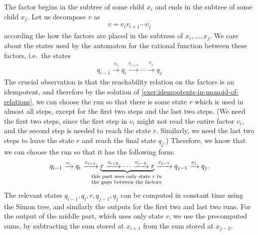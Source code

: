 {The factor begins in the subtree of some child $x_i$ and ends in the subtree of some child $x_j$. Let us decompose $v$ as 
\begin{align*}
v = v_i v_{i+1} \cdots v_{j}
\end{align*}
according the how the factors are placed in the subtrees of $x_i,\ldots,x_j$. We care about the states used by the automaton for the rational function between these factors, i.e.~the states 
\begin{align*}
q_{i-1} \xrightarrow {v_i} q_i \xrightarrow{v_{i+1}} \cdots \xrightarrow{v_j} q_j
\end{align*}
The crucial observation is that the reachability relation on the factors is an idempotent, and therefore by the solution of \cref{exer:idempotents-in-monoid-of-relations}, we can choose the run so that there is some state $r$ which is used in almost all steps, except for the first two steps and the last two steps. (We need the first two steps, since the first step in $v_i$ might not read the entire factor $v_i$, and the second step is needed to reach the state $r$. Similarly, we need the last two steps to leave the state $r$ and reach the final state $q_j$.) Therefore, we know that we can choose the run so that it has the following form:
\begin{align*}
q_{i-1} \xrightarrow {v_i} q_i \xrightarrow{v_{i+1}} \myunderbrace{r \xrightarrow{v_{i+2}} \cdots  \xrightarrow{v_{j-2}} r}{this part uses only state $r$ in \\ the gaps between the factors} \xrightarrow{v_{j-1}} q_{j-1} \xrightarrow{v_j} q_j.
\end{align*}
The relevant states  $q_{i-1},q_i,r,  q_{j-1},q_j$ can be computed in constant time using the Simon tree, and similarly the outputs for the first two and last two runs. For the output of the middle part, which uses only state $r$, we use the precomputed sums, by subtracting the sum stored at $x_{i+1}$ from the sum stored at $x_{j-2}$.} 
